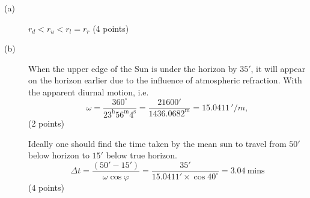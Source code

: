 \begin{description}
\item[(a)] $r_d < r_u < r_l = r_r$ \hfill(4 points)
\item[(b)] When the upper edge of the Sun is under the horizon by $35'$, it
  will appear on the horizon earlier due to the influence of atmospheric
  refraction. With the apparent diurnal motion, i.e.
  \[ \omega = \frac{360^\circ}{23^{\mathrm{h}}56^{\mathrm{m}}4^{\mathrm{s}}}
     = \frac{21600'}{1436.0682^{\mathrm{m}}} = 15.0411\,'/m, \]
  \hfill(2 points)

  Ideally one should find the time taken by the mean sun to travel from
  $50'$ below horizon to $15'$ below true horizon.
  \[ \Delta t = \frac{(50' - 15')}{\omega\cos\varphi}
     = \frac{35'}{15.0411'\times\cos 40^\circ} = 3.04\ \mathrm{mins} \]
  \hfill(4 points)
\end{description}
